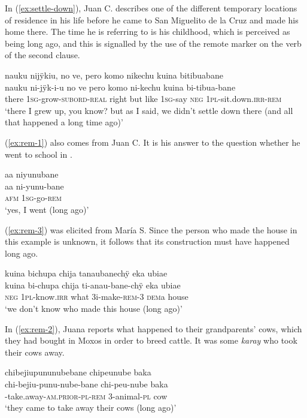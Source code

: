 In (\ref{ex:settle-down}), Juan C. describes one of the different temporary locations of residence in his life before he came to San Miguelito de la Cruz and made his home there. The time he is referring to is his childhood, which is perceived as being long ago, and this is signalled by the use of the remote marker on the verb of the second clause.

\ea\label{ex:settle-down}
\begingl 
\glpreamble nauku nijÿkiu, no ve, pero komo nikechu kuina bitibuabane\\
\gla nauku ni-jÿk-i-u {no ve} pero komo ni-kechu kuina bi-tibua-bane\\ 
\glb there 1\textsc{sg}-grow-\textsc{subord}-\textsc{real} {right} but like 1\textsc{sg}-say \textsc{neg} 1\textsc{pl}-sit.down.\textsc{irr}-\textsc{rem}\\ 
\glft ‘there I grew up, you know? but as I said, we didn’t settle down there (and all that happened a long time ago)’\\ 
\endgl
\trailingcitation{[mqx-p110826l.438]}
\xe

(\ref{ex:rem-1}) also comes from Juan C. It is his answer to the question whether he went to school in .

\ea\label{ex:rem-1}
\begingl
\glpreamble aa niyunubane\\
\gla aa ni-yunu-bane\\
\glb \textsc{afm} 1\textsc{sg}-go-\textsc{rem}\\
\glft ‘yes, I went (long ago)’
\endgl
\trailingcitation{[mqx-p110826l.213]}
\xe

(\ref{ex:rem-3}) was elicited from María S. Since the person who made the house in this example is unknown, it follows that its construction must have happened long ago.

\ea\label{ex:rem-3}
\begingl
\glpreamble kuina bichupa chija tanaubanechÿ eka ubiae\\
\gla kuina bi-chupa chija ti-anau-bane-chÿ eka ubiae\\
\glb \textsc{neg} 1\textsc{pl}-know.\textsc{irr} what 3i-make-\textsc{rem}-3 \textsc{dem}a house\\
\glft ‘we don’t know who made this house (long ago)’
\endgl
\trailingcitation{[rxx-e201231f.38]}
\xe

In (\ref{ex:rem-2}), Juana reports what happened to their grandparents’ cows, which they had bought in Moxos in order to breed cattle. It was some \textit{karay} who took their cows away.

\ea\label{ex:rem-2}
\begingl
\glpreamble chibejiupununubebane chipeunube baka\\
\gla chi-bejiu-punu-nube-bane chi-peu-nube baka\\
-take.away-\textsc{am.prior}-\textsc{pl}-\textsc{rem} 3-animal-\textsc{pl} cow\\
\glft ‘they came to take away their cows (long ago)’
\endgl
\trailingcitation{[jxx-e150925l-1.226]}
\xe


